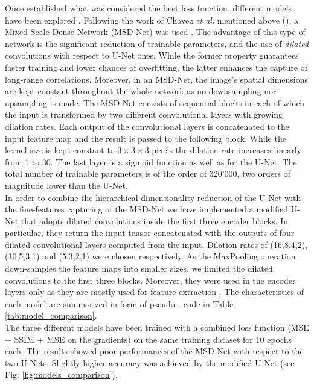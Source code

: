 Once established what was considered the best loss function, different models have been explored . 
Following the work of Chavez \textit{et al.} mentioned above (\cite{chavez_comparison_2022}), a 
Mixed-Scale Dense Network (MSD-Net) was used \cite{MSD_Pelt2017}. The advantage of this type of network is the significant reduction of trainable
parameters, and the use of \textit{dilated} convolutions with respect to U-Net ones. While the former property guarantees
faster training and lower chances of overfitting, the latter enhances the capture of long-range correlations. Moreover, 
in an MSD-Net, the image's spatial dimensions are kept constant throughout the whole network as no downsampling nor upsampling is made.
The MSD-Net consists of sequential blocks in each of which the input is transformed by two different 
convolutional layers with growing dilation rates. Each output of the convolutional layers is concatenated to the input 
feature map and the result is passed to the following block. While the kernel size is kept constant to $3\times3\times3$ pixels
the dilation rate increases linearly from 1 to 30. The last layer is a sigmoid function as well as for the U-Net. 
The total number of trainable parameters is of the order of 320'000, two orders of magnitude lower than the U-Net.
\\
In order to combine the hierarchical dimensionality reduction of the U-Net with the fine-features capturing of the MSD-Net 
we have implemented a modified U-Net that adopts dilated convolutions inside the first three encoder blocks. In particular, 
they return the input tensor concatenated with the outputs of four dilated convolutional layers computed
from the input. Dilation rates of (16,8,4,2), (10,5,3,1) and (5,3,2,1) were chosen respectively. As the MaxPooling 
operation down-samples the feature maps into smaller sizes, we limited the dilated convolutions to the first three 
blocks. Moreover, they were used in the encoder layers only as they are mostly used for feature extraction \cite{dilated_conv}.
The characteristics of each model are summarized in form of pseudo - code in Table \ref{tab:model_comparison}.
\\

The three different models have been trained with a combined loss function (MSE + SSIM + MSE on the gradients) on the 
same training dataset for 10 epochs each.  The results showed poor performances of the MSD-Net with respect to the two 
U-Nets. Slightly higher accuracy was achieved by the modified U-Net (see Fig. \ref{fig:models_comparison}). 

